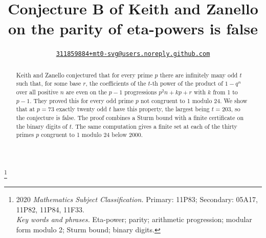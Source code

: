 \documentclass[12pt]{amsart}
\makeatletter
\newcommand{\repo}{https://github.com/mt0-svg/keith-zanello-73}
\DeclareRobustCommand{\authorlink}{\href{\repo/issues/new/choose}{\nolinkurl{311859884+mt0-svg@users.noreply.github.com}}}
\theoremstyle{definition}
\makeatother
\begin{document}
\title[Conjecture B of Keith and Zanello is false]{Conjecture B of Keith and Zanello on the parity of eta-powers is false}
\author{\authorlink}
\thanks{2020 {\em Mathematics Subject Classification.} Primary: 11P83; Secondary: 05A17, 11P82, 11P84, 11F33.\\\indent
{\em Key words and phrases.} Eta-power; parity; arithmetic progression; modular form modulo 2; Sturm bound; binary digits.}

\begin{abstract}
Keith and Zanello conjectured that for every prime $p$ there are infinitely many odd $t$ such that, for some base $r$, the coefficients of the $t$-th power of the product of $1-q^n$ over all positive $n$ are even on the $p-1$ progressions $p^2n+kp+r$ with $k$ from 1 to $p-1$. They proved this for every odd prime $p$ not congruent to 1 modulo 24. We show that at $p=73$ exactly twenty odd $t$ have this property, the largest being $t=203$, so the conjecture is false. The proof combines a Sturm bound with a finite certificate on the binary digits of $t$. The same computation gives a finite set at each of the thirty primes $p$ congruent to 1 modulo 24 below 2000.
\end{abstract}

\maketitle
\end{document}

